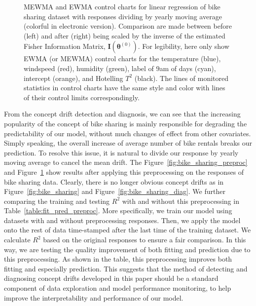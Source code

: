 \documentclass[twoside,11pt]{article}
\begin{document}
\begin{figure}[!htbp]
  \caption{
  MEWMA and EWMA control charts for linear regression of bike sharing dataset with responses dividing by yearly moving average (colorful in electronic version). Comparison are made between before (left) and after (right) being scaled by the inverse of the estimated Fisher Information Matrix, $\mathbf {I} ( {\bm{\theta}} ^{(0)})$. For legibility, here only show EWMA (or MEWMA) control charts for the temperature (blue), windspeed (red), humidity (green), label of $9$am of days (cyan), intercept (orange), and Hotelling $T^2$ (black). The lines of monitored statistics in control charts have the same style and color with lines of their control limits correspondingly.
}
\label{fig:bike_sharing_preproc_diag}
\end{figure}

From the concept drift detection and diagnosis, we can see that the increasing popularity of the concept of bike sharing is mainly responsible for degrading the predictability of our model, without much changes of effect from other covariates. Simply speaking, the overall increase of average number of bike rentals breaks our prediction. To resolve this issue, it is natural to divide our response by yearly moving average to cancel the mean drift. The Figure~\ref{fig:bike_sharing_preproc} and Figure~\ref{fig:bike_sharing_preproc_diag} show results after applying this preprocessing on the responses of bike sharing data. Clearly, there is no longer obvious concept drifts as in Figure~\ref{fig:bike_sharing} and Figure~\ref{fig:bike_sharing_diag}. We further comparing the training and testing $R^2$ with and without this preprocessing in Table~\ref{table:fit_pred_preproc}. More specifically, we train our model using datasets with and without preprocessing responses. Then, we apply the model onto the rest of data time-stamped after the last time of the training dataset. We calculate $R^2$ based on the original responses to ensure a fair comparison. In this way, we are testing the quality improvement of both fitting and prediction due to this preprocessing. As shown in the table, this preprocessing improves both fitting and especially prediction. This suggests that the method of detecting and diagnosing concept drifts developed in this paper should be a standard component of data exploration and model performance monitoring, to help improve the interpretability and performance of our model. 
\end{document}
